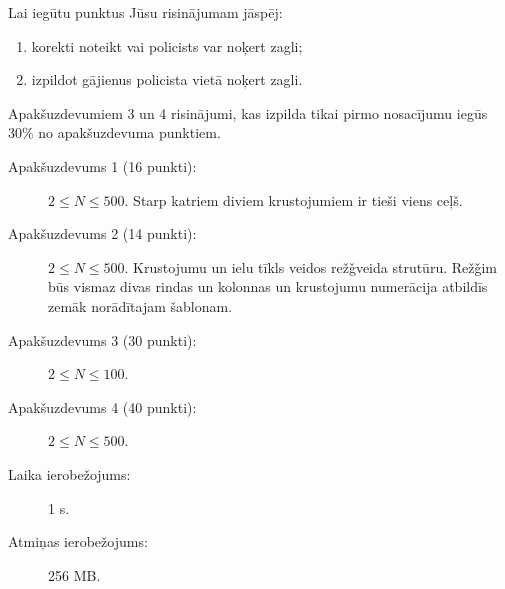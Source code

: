 \documentclass{boi2014-lv}
\begin{document}
    \Scoring
	Lai iegūtu punktus Jūsu risinājumam jāspēj:
    \begin{enumerate}
    	\item korekti noteikt vai policists var noķert zagli;%
	\item izpildot gājienus policista vietā noķert zagli.%
    \end{enumerate}
    
	Apakšuzdevumiem 3 un 4 risinājumi, kas izpilda tikai pirmo nosacījumu iegūs 30\% no apakšuzdevuma punktiem.

    \begin{description}
        \item[Apakšuzdevums 1 (16 punkti):] $2 \le N \le 500$. Starp katriem diviem krustojumiem ir tieši viens ceļš.%
        \item[Apakšuzdevums 2 (14 punkti):] $2 \le N \le 500$.  Krustojumu un ielu tīkls veidos rež\v{g}veida strutūru. Rež\v{g}im būs vismaz divas rindas un kolonnas un krustojumu numerācija atbildīs zemāk norādītajam šablonam.
        \begin{figure}[h!]
           \centering
        \end{figure}
        \item[Apakšuzdevums 3 (30 punkti):] $2 \le N \le 100$.
        \item[Apakšuzdevums 4 (40 punkti):] $2 \le N \le 500$.
    \end{description}

    \Constraints
    
    \begin{description}
        \item[Laika ierobežojums:] 1 s.
        \item[Atmiņas ierobežojums:] 256 MB.
    \end{description}
\end{document}
